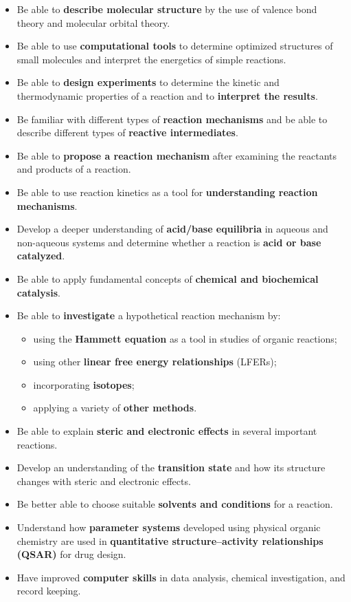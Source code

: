 \begin{itemize}
\item Be able to \textbf{describe molecular structure} by the use of valence bond theory and molecular orbital theory.
\item Be able to use \textbf{computational tools} to determine optimized structures of small molecules and interpret the energetics of simple reactions.
\item Be able to \textbf{design experiments} to determine the kinetic and thermodynamic properties of a reaction and to \textbf{interpret the results}.
\item Be familiar with different types of \textbf{reaction mechanisms} and be able to describe different types of \textbf{reactive intermediates}.
\item Be able to \textbf{propose a reaction mechanism} after examining the reactants and products of a reaction.
\item Be able to use reaction kinetics as a tool for \textbf{understanding reaction mechanisms}.
\item Develop a deeper understanding of \textbf{acid/base equilibria} in aqueous and non-aqueous systems and determine whether a reaction is \textbf{acid or base catalyzed}.
\item Be able to apply fundamental concepts of \textbf{chemical and biochemical catalysis}.
\item Be able to \textbf{investigate} a hypothetical reaction mechanism by:
\begin{itemize}
\item using the \textbf{Hammett equation} as a tool in studies of organic reactions;
\item using other \textbf{linear free energy relationships} (LFERs);
\item incorporating \textbf{isotopes};
\item applying a variety of \textbf{other methods}.
\end{itemize}
\item Be able to explain \textbf{steric and electronic effects} in several important reactions.
\item Develop an understanding of the \textbf{transition state} and how its structure changes with steric and electronic effects.
\item Be better able to choose suitable \textbf{solvents and conditions} for a reaction.
\item Understand how \textbf{parameter systems} developed using physical organic chemistry are used in \textbf{quantitative structure--activity relationships (QSAR)} for drug design.
\item Have improved \textbf{computer skills} in data analysis, chemical investigation, and record keeping.
\end{itemize}

